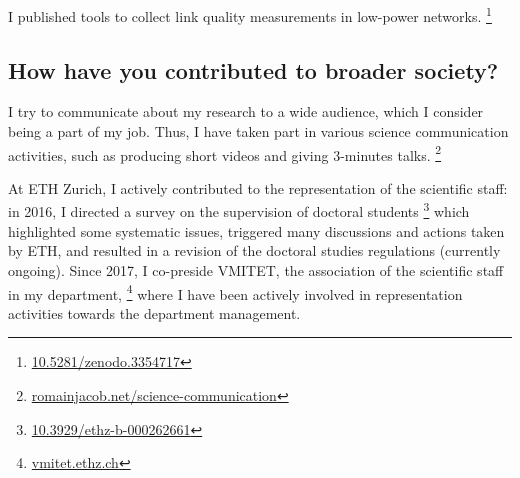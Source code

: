 
I published tools to collect link quality measurements in low-power networks.%
\footnote{\href{https://doi.org/10.5281/zenodo.3354717}{10.5281/zenodo.3354717}}

\subsection*{How have you contributed to broader society?}

\squarepar
{%
  I try to communicate about my research to a wide audience, which I consider being a part of my job. Thus, I have taken part in various science communication activities, such as producing short videos and giving 3-minutes talks.%
  \footnote{\href{https://www.romainjacob.net/science-communication/}{romainjacob.net/science-communication}}%
}

{%
  At ETH Zurich, I actively contributed to the representation of the scientific staff:
  in 2016, I directed a survey on the supervision of doctoral students%
  \footnote{\href{https://doi.org/10.3929/ethz-b-000262661}{10.3929/ethz-b-000262661}}
  which highlighted some systematic issues, triggered many discussions and actions taken by ETH, and resulted in a revision of the doctoral studies regulations (currently ongoing).
  Since 2017, I co-preside VMITET, the association of the scientific staff in my department,%
  \footnote{\href{https://www.vmitet.ethz.ch/}{vmitet.ethz.ch}}
  where I have been actively involved in representation activities towards the department management.%
}


